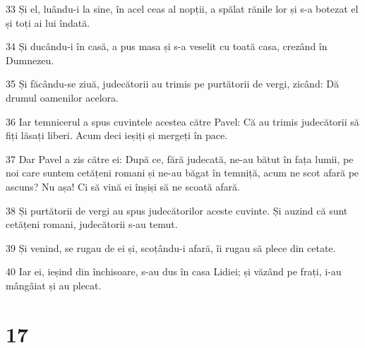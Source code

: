 \par 33 Și el, luându-i la sine, în acel ceas al nopții, a spălat rănile lor și s-a botezat el și toți ai lui îndată.
\par 34 Și ducându-i în casă, a pus masa și s-a veselit cu toată casa, crezând în Dumnezeu.
\par 35 Și făcându-se ziuă, judecătorii au trimis pe purtătorii de vergi, zicând: Dă drumul oamenilor acelora.
\par 36 Iar temnicerul a spus cuvintele acestea către Pavel: Că au trimis judecătorii să fiți lăsați liberi. Acum deci ieșiți și mergeți în pace.
\par 37 Dar Pavel a zis către ei: După ce, fără judecată, ne-au bătut în fața lumii, pe noi care suntem cetățeni romani și ne-au băgat în temniță, acum ne scot afară pe ascuns? Nu așa! Ci să vină ei înșiși să ne scoată afară.
\par 38 Și purtătorii de vergi au spus judecătorilor aceste cuvinte. Și auzind că sunt cetățeni romani, judecătorii s-au temut.
\par 39 Și venind, se rugau de ei și, scoțându-i afară, îi rugau să plece din cetate.
\par 40 Iar ei, ieșind din închisoare, s-au dus în casa Lidiei; și văzând pe frați, i-au mângâiat și au plecat.

\chapter{17}

